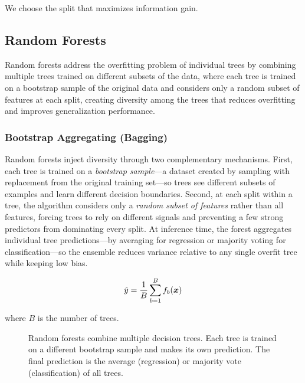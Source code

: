 We choose the split that maximizes information gain.

\subsection{Random Forests}

Random forests address the overfitting problem of individual trees by combining multiple trees trained on different subsets of the data, where each tree is trained on a bootstrap sample of the original data and considers only a random subset of features at each split, creating diversity among the trees that reduces overfitting and improves generalization performance.

\subsubsection{Bootstrap Aggregating (Bagging)}

Random forests inject diversity through two complementary mechanisms. First, each tree is trained on a \emph{bootstrap sample}—a dataset created by sampling with replacement from the original training set—so trees see different subsets of examples and learn different decision boundaries. Second, at each split within a tree, the algorithm considers only a \emph{random subset of features} rather than all features, forcing trees to rely on different signals and preventing a few strong predictors from dominating every split. At inference time, the forest aggregates individual tree predictions—by averaging for regression or majority voting for classification—so the ensemble reduces variance relative to any single overfit tree while keeping low bias.

\begin{equation}
\hat{y} = \frac{1}{B} \sum_{b=1}^{B} f_b(\boldsymbol{x})
\end{equation}

where $B$ is the number of trees.

\begin{figure}[htbp]
\centering
{}
\caption{Random forests combine multiple decision trees. Each tree is trained on a different bootstrap sample and makes its own prediction. The final prediction is the average (regression) or majority vote (classification) of all trees.}
\label{fig:random-forest}
\end{figure}

